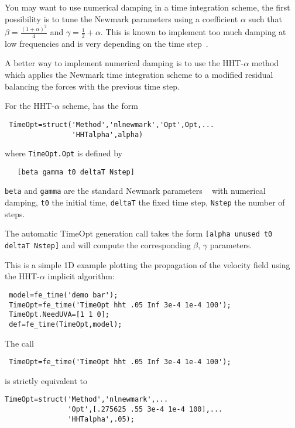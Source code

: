 
You may want to use numerical damping in a time integration scheme, the first possibility is to tune the Newmark parameters using a coefficient $\alpha$ such that $\beta = \frac{(1+\alpha)^2}{4}$ and $\gamma=\frac{1}{2}+\alpha$. This is known to implement too much damping at low frequencies and is very depending on the time step~.

A better way to implement numerical damping is to use the HHT-$\alpha$ method which applies the Newmark time integration scheme to a modified residual balancing the forces with the previous time step.

For the HHT-$\alpha$ scheme, {} has the form
\begin{verbatim}
 TimeOpt=struct('Method','nlnewmark','Opt',Opt,...
                'HHTalpha',alpha)
\end{verbatim}

where {\tt TimeOpt.Opt} is defined by
\begin{verbatim}
   [beta gamma t0 deltaT Nstep]
\end{verbatim}


{\tt beta} and {\tt gamma} are the standard Newmark parameters ~ with numerical damping, {\tt t0} the initial time, {\tt deltaT} the fixed time step, {\tt Nstep} the number of steps.

The automatic TimeOpt generation call takes the form {\tt [alpha unused t0 deltaT Nstep]} and will compute the corresponding $\beta$, $\gamma$ parameters.

This is a simple 1D example plotting the propagation of the velocity field using the HHT-$\alpha$ implicit algorithm:

\begin{verbatim}
 model=fe_time('demo bar'); 
 TimeOpt=fe_time('TimeOpt hht .05 Inf 3e-4 1e-4 100');
 TimeOpt.NeedUVA=[1 1 0];
 def=fe_time(TimeOpt,model);
\end{verbatim}%


The call 
%
\begin{verbatim}
 TimeOpt=fe_time('TimeOpt hht .05 Inf 3e-4 1e-4 100');
\end{verbatim}

%
is strictly equivalent to
%
\begin{verbatim}
TimeOpt=struct('Method','nlnewmark',...
               'Opt',[.275625 .55 3e-4 1e-4 100],...
               'HHTalpha',.05);
\end{verbatim}



